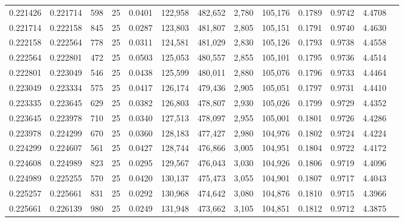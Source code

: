 \begin{tabular}{rrrrrrrrrrrrr}
0.221426 & 0.221714 &   598 &  25 &                                     0.0401 & 122,958 & 482,652 &   2,780 & 105,176 & 0.1789 & 0.9742 & 4.4708 \\
0.221714 & 0.222158 &   845 &  25 &                                     0.0287 & 123,803 & 481,807 &   2,805 & 105,151 & 0.1791 & 0.9740 & 4.4630 \\
0.222158 & 0.222564 &   778 &  25 &                                     0.0311 & 124,581 & 481,029 &   2,830 & 105,126 & 0.1793 & 0.9738 & 4.4558 \\
0.222564 & 0.222801 &   472 &  25 &                                     0.0503 & 125,053 & 480,557 &   2,855 & 105,101 & 0.1795 & 0.9736 & 4.4514 \\
0.222801 & 0.223049 &   546 &  25 &                                     0.0438 & 125,599 & 480,011 &   2,880 & 105,076 & 0.1796 & 0.9733 & 4.4464 \\
0.223049 & 0.223334 &   575 &  25 &                                     0.0417 & 126,174 & 479,436 &   2,905 & 105,051 & 0.1797 & 0.9731 & 4.4410 \\
0.223335 & 0.223645 &   629 &  25 &                                     0.0382 & 126,803 & 478,807 &   2,930 & 105,026 & 0.1799 & 0.9729 & 4.4352 \\
0.223645 & 0.223978 &   710 &  25 &                                     0.0340 & 127,513 & 478,097 &   2,955 & 105,001 & 0.1801 & 0.9726 & 4.4286 \\
0.223978 & 0.224299 &   670 &  25 &                                     0.0360 & 128,183 & 477,427 &   2,980 & 104,976 & 0.1802 & 0.9724 & 4.4224 \\
0.224299 & 0.224607 &   561 &  25 &                                     0.0427 & 128,744 & 476,866 &   3,005 & 104,951 & 0.1804 & 0.9722 & 4.4172 \\
0.224608 & 0.224989 &   823 &  25 &                                     0.0295 & 129,567 & 476,043 &   3,030 & 104,926 & 0.1806 & 0.9719 & 4.4096 \\
0.224989 & 0.225255 &   570 &  25 &                                     0.0420 & 130,137 & 475,473 &   3,055 & 104,901 & 0.1807 & 0.9717 & 4.4043 \\
0.225257 & 0.225661 &   831 &  25 &                                     0.0292 & 130,968 & 474,642 &   3,080 & 104,876 & 0.1810 & 0.9715 & 4.3966 \\
0.225661 & 0.226139 &   980 &  25 &                                     0.0249 & 131,948 & 473,662 &   3,105 & 104,851 & 0.1812 & 0.9712 & 4.3875 \\

\end{tabular}
